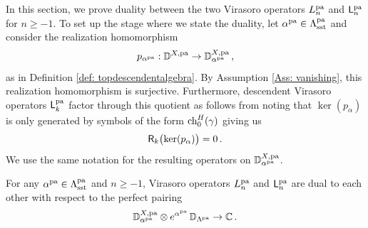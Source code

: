 \documentclass[a4paper, 12pt]{amsart}
\begin{document}
In this section, we prove duality between the two Virasoro operators $L_n^{\mathop{\rm pa}\nolimits}$ and ${\mathsf{L}}_n^{\mathop{\rm pa}\nolimits}$ for $n\geq -1$. To set up the stage where we state the duality, let $\alpha^{\mathop{\rm pa}\nolimits}\in \Lambda_{\text{sst}}^{\mathop{\rm pa}\nolimits}$ and consider the realization homomorphism 
$$p_{\alpha^{\mathop{\rm pa}\nolimits}}:{\mathbb{D}}^{X,{\mathop{\rm pa}\nolimits}}\rightarrow {\mathbb{D}}^{X,\mathop{\rm pa}\nolimits}_{\alpha^{\mathop{\rm pa}\nolimits}}\,,
$$
as in Definition \ref{def: topdescendentalgebra}. By Assumption \ref{Ass: vanishing}, this realization homomorphism is surjective. Furthermore, descendent Virasoro operators ${\mathsf{L}}_k^{\mathop{\rm pa}\nolimits}$ factor through this quotient as follows from noting that $\ker(p_{\alpha})$ is only generated by symbols of the form $\mathrm{ch}^H_0(\gamma)$ giving us $$\mathsf{R}_k\big(\!\ker(p_{\alpha})\big)=0 \,.$$
We use the same notation for the resulting operators on ${\mathbb{D}}^{X,\mathop{\rm pa}\nolimits}_{\alpha^{\mathop{\rm pa}\nolimits}}$. 
\begin{theorem}\label{thm: duality}
For any $\alpha^{\mathop{\rm pa}\nolimits}\in \Lambda_{\text{sst}}^{\mathop{\rm pa}\nolimits}$ and $n\geq -1$, Virasoro operators $L_n^{\mathop{\rm pa}\nolimits}$ and ${\mathsf{L}}_n^{\mathop{\rm pa}\nolimits}$ are dual to each other with respect to the perfect pairing 
$${\mathbb{D}}^{X,\mathop{\rm pa}\nolimits}_{\alpha^{\mathop{\rm pa}\nolimits}}\otimes e^{\alpha^{\mathop{\rm pa}\nolimits}}\, {\mathbb{D}}_{\Lambda^{\mathop{\rm pa}\nolimits}}\rightarrow {\mathbb{C}}\,.
$$
\end{theorem}
\end{document}
